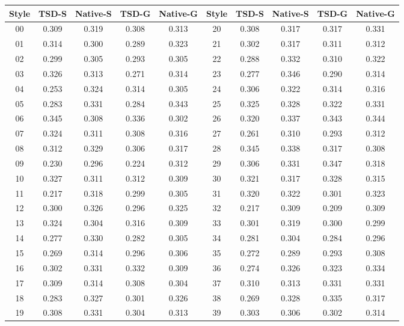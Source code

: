 \begin{tabular}{ccccc@{\hspace{14pt}}ccccc}
\toprule
Style & TSD-S & Native-S & TSD-G & Native-G & Style & TSD-S & Native-S & TSD-G & Native-G \\
\midrule
00 & 0.309 & 0.319 & 0.308 & 0.313 & 20 & 0.308 & 0.317 & 0.317 & 0.331 \\
01 & 0.314 & 0.300 & 0.289 & 0.323 & 21 & 0.302 & 0.317 & 0.311 & 0.312 \\
02 & 0.299 & 0.305 & 0.293 & 0.305 & 22 & 0.288 & 0.332 & 0.310 & 0.322 \\
03 & 0.326 & 0.313 & 0.271 & 0.314 & 23 & 0.277 & 0.346 & 0.290 & 0.314 \\
04 & 0.253 & 0.324 & 0.314 & 0.305 & 24 & 0.306 & 0.322 & 0.314 & 0.316 \\
05 & 0.283 & 0.331 & 0.284 & 0.343 & 25 & 0.325 & 0.328 & 0.322 & 0.331 \\
06 & 0.345 & 0.308 & 0.336 & 0.302 & 26 & 0.320 & 0.337 & 0.343 & 0.344 \\
07 & 0.324 & 0.311 & 0.308 & 0.316 & 27 & 0.261 & 0.310 & 0.293 & 0.312 \\
08 & 0.312 & 0.329 & 0.306 & 0.317 & 28 & 0.345 & 0.338 & 0.317 & 0.308 \\
09 & 0.230 & 0.296 & 0.224 & 0.312 & 29 & 0.306 & 0.331 & 0.347 & 0.318 \\
10 & 0.327 & 0.311 & 0.312 & 0.309 & 30 & 0.321 & 0.317 & 0.328 & 0.315 \\
11 & 0.217 & 0.318 & 0.299 & 0.305 & 31 & 0.320 & 0.322 & 0.301 & 0.323 \\
12 & 0.300 & 0.326 & 0.296 & 0.325 & 32 & 0.217 & 0.309 & 0.209 & 0.309 \\
13 & 0.324 & 0.304 & 0.316 & 0.309 & 33 & 0.301 & 0.319 & 0.300 & 0.299 \\
14 & 0.277 & 0.330 & 0.282 & 0.305 & 34 & 0.281 & 0.304 & 0.284 & 0.296 \\
15 & 0.269 & 0.314 & 0.296 & 0.306 & 35 & 0.272 & 0.289 & 0.293 & 0.308 \\
16 & 0.302 & 0.331 & 0.332 & 0.309 & 36 & 0.274 & 0.326 & 0.323 & 0.334 \\
17 & 0.309 & 0.314 & 0.308 & 0.304 & 37 & 0.310 & 0.313 & 0.331 & 0.331 \\
18 & 0.283 & 0.327 & 0.301 & 0.326 & 38 & 0.269 & 0.328 & 0.335 & 0.317 \\
19 & 0.308 & 0.331 & 0.304 & 0.313 & 39 & 0.303 & 0.306 & 0.302 & 0.314 \\
\bottomrule
\end{tabular}

